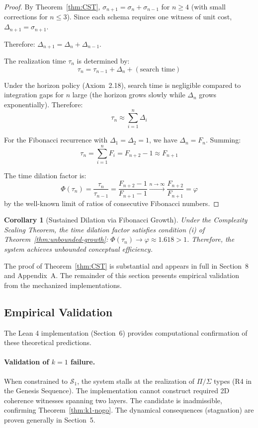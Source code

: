 \documentclass[11pt]{article}
\newtheorem{corollary}[theorem]{Corollary}
\theoremstyle{definition}
\theoremstyle{remark}
\begin{document}
\begin{proof}
By Theorem~\ref{thm:CST}, $\sigma_{n+1} = \sigma_n + \sigma_{n-1}$ for $n \geq 4$ (with small corrections
for $n \leq 3$). Since each schema requires one witness of unit cost, $\Delta_{n+1} = \sigma_{n+1}$.

Therefore: $\Delta_{n+1} = \Delta_n + \Delta_{n-1}$.

The realization time $\tau_n$ is determined by:
\[
\tau_n = \tau_{n-1} + \Delta_n + (\text{search time})
\]

Under the horizon policy (Axiom~2.18), search time is negligible compared to integration gaps
for $n$ large (the horizon grows slowly while $\Delta_n$ grows exponentially). Therefore:
\[
\tau_n \approx \sum_{i=1}^n \Delta_i
\]

For the Fibonacci recurrence with $\Delta_1 = \Delta_2 = 1$, we have $\Delta_n = F_n$. Summing:
\[
\tau_n = \sum_{i=1}^n F_i = F_{n+2} - 1 \approx F_{n+1}
\]

The time dilation factor is:
\[
\Phi(\tau_n) = \frac{\tau_n}{\tau_{n-1}} = \frac{F_{n+2} - 1}{F_{n+1} - 1} \xrightarrow{n \to \infty} \frac{F_{n+2}}{F_{n+1}} = \varphi
\]
by the well-known limit of ratios of consecutive Fibonacci numbers.
\end{proof}

\begin{corollary}[Sustained Dilation via Fibonacci Growth]
\label{cor:sustained-dilation}
Under the Complexity Scaling Theorem, the time dilation factor satisfies condition (i) of
Theorem~\ref{thm:unbounded-growth}: $\Phi(\tau_n) \to \varphi \approx 1.618 > 1$. Therefore, the
system achieves unbounded conceptual efficiency.
\end{corollary}

The proof of Theorem~\ref{thm:CST} is substantial and appears in full in Section~8 and Appendix~A.
The remainder of this section presents empirical validation from the mechanized implementations.

\subsection{Empirical Validation}

The Lean 4 implementation (Section~6) provides computational confirmation of these theoretical
predictions.

\paragraph{Validation of $k = 1$ failure.}
When constrained to $\mathcal{S}_1$, the system stalls at the realization of $\Pi/\Sigma$ types (R4 in the
Genesis Sequence). The implementation cannot construct required 2D coherence witnesses spanning
two layers. The candidate is inadmissible, confirming Theorem~\ref{thm:k1-nogo}. The dynamical
consequences (stagnation) are proven generally in Section~5.
\end{document}
